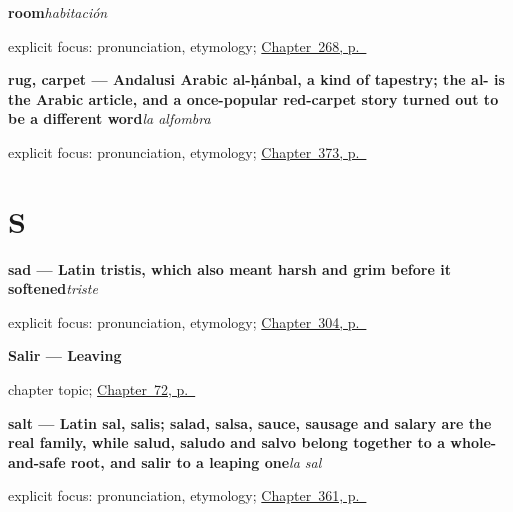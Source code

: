 \noindent\begin{minipage}[t]{\linewidth}
\raggedright
\textbf{room}\enspace\emph{habitación}\par
\footnotesize explicit focus: pronunciation, etymology; \hyperref[ch:viajar]{Chapter~268, p.~\pageref*{ch:viajar}}
\end{minipage}\par\smallskip

\noindent\begin{minipage}[t]{\linewidth}
\raggedright
\textbf{rug, carpet — Andalusi Arabic al-ḥánbal, a kind of tapestry; the al- is the Arabic article, and a once-popular red-carpet story turned out to be a different word}\enspace\emph{la alfombra}\par
\footnotesize explicit focus: pronunciation, etymology; \hyperref[ch:el-oro-y-la-botella]{Chapter~373, p.~\pageref*{ch:el-oro-y-la-botella}}
\end{minipage}\par\smallskip

\section*{S}

\noindent\begin{minipage}[t]{\linewidth}
\raggedright
\textbf{sad — Latin tristis, which also meant harsh and grim before it softened}\enspace\emph{triste}\par
\footnotesize explicit focus: pronunciation, etymology; \hyperref[ch:como-estoy]{Chapter~304, p.~\pageref*{ch:como-estoy}}
\end{minipage}\par\smallskip

\noindent\begin{minipage}[t]{\linewidth}
\raggedright
\textbf{Salir --- Leaving}\par
\footnotesize chapter topic; \hyperref[ch:spanish-salir]{Chapter~72, p.~\pageref*{ch:spanish-salir}}
\end{minipage}\par\smallskip

\noindent\begin{minipage}[t]{\linewidth}
\raggedright
\textbf{salt — Latin sal, salis; salad, salsa, sauce, sausage and salary are the real family, while salud, saludo and salvo belong together to a whole-and-safe root, and salir to a leaping one}\enspace\emph{la sal}\par
\footnotesize explicit focus: pronunciation, etymology; \hyperref[ch:la-carne-y-la-leche]{Chapter~361, p.~\pageref*{ch:la-carne-y-la-leche}}
\end{minipage}\par\smallskip

